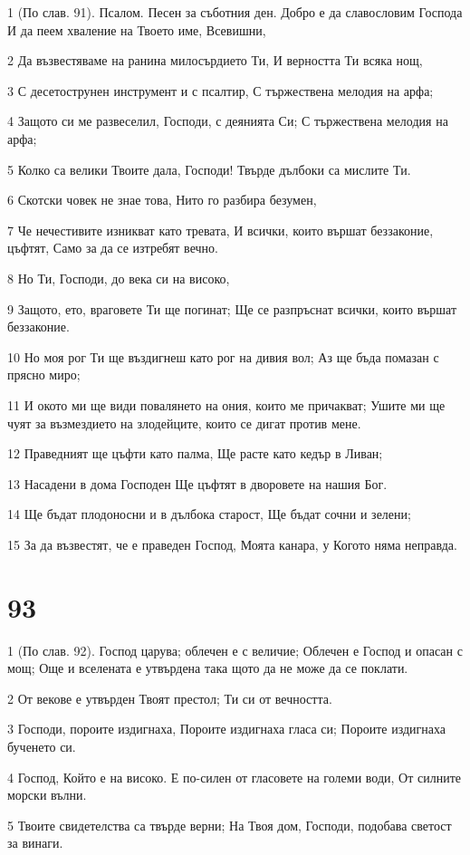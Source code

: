 \par 1 (По слав. 91). Псалом. Песен за съботния ден. Добро е да славословим Господа И да пеем хваление на Твоето име, Всевишни,
\par 2 Да възвестяваме на ранина милосърдието Ти, И верността Ти всяка нощ,
\par 3 С десетострунен инструмент и с псалтир, С тържествена мелодия на арфа;
\par 4 Защото си ме развеселил, Господи, с деянията Си; С тържествена мелодия на арфа;
\par 5 Колко са велики Твоите дала, Господи! Твърде дълбоки са мислите Ти.
\par 6 Скотски човек не знае това, Нито го разбира безумен,
\par 7 Че нечестивите изникват като тревата, И всички, които вършат беззаконие, цъфтят, Само за да се изтребят вечно.
\par 8 Но Ти, Господи, до века си на високо,
\par 9 Защото, ето, враговете Ти ще погинат; Ще се разпръснат всички, които вършат беззаконие.
\par 10 Но моя рог Ти ще въздигнеш като рог на дивия вол; Аз ще бъда помазан с прясно миро;
\par 11 И окото ми ще види повалянето на ония, които ме причакват; Ушите ми ще чуят за възмездието на злодейците, които се дигат против мене.
\par 12 Праведният ще цъфти като палма, Ще расте като кедър в Ливан;
\par 13 Насадени в дома Господен Ще цъфтят в дворовете на нашия Бог.
\par 14 Ще бъдат плодоносни и в дълбока старост, Ще бъдат сочни и зелени;
\par 15 За да възвестят, че е праведен Господ, Моята канара, у Когото няма неправда.

\chapter{93}

\par 1 (По слав. 92). Господ царува; облечен е с величие; Облечен е Господ и опасан с мощ; Още и вселената е утвърдена така щото да не може да се поклати.
\par 2 От векове е утвърден Твоят престол; Ти си от вечността.
\par 3 Господи, пороите издигнаха, Пороите издигнаха гласа си; Пороите издигнаха бученето си.
\par 4 Господ, Който е на високо. Е по-силен от гласовете на големи води, От силните морски вълни.
\par 5 Твоите свидетелства са твърде верни; На Твоя дом, Господи, подобава светост за винаги.

